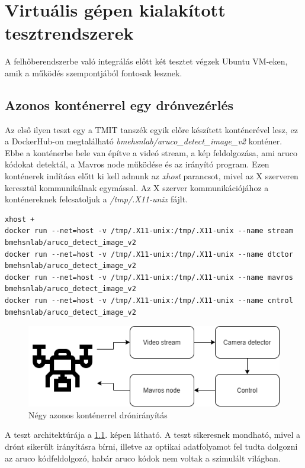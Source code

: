 \chapter{Virtuális gépen kialakított tesztrendszerek}
\label{chap:vmtest}
A felhőberendszerbe való integrálás előtt két tesztet végzek Ubuntu VM-eken, amik a működés szempontjából fontosak lesznek.
\section{Azonos konténerrel egy drónvezérlés}
Az első ilyen teszt egy a TMIT tanszék egyik előre készített konténerével lesz, ez a DockerHub-on megtalálható \emph{bmehsnlab/aruco\_detect\_image\_v2} konténer. Ebbe a konténerbe bele van építve a videó stream, a kép feldolgozása, ami aruco kódokat detektál, a Mavros node működése és az irányító program.
Ezen konténerek indítása előtt ki kell adnunk az \emph{xhost} parancsot, mivel az X szerveren keresztül kommunikálnak egymással. Az X szerver kommunikációjához a konténereknek felcsatoljuk a \emph{/tmp/.X11-unix} fájlt.
\begin{lstlisting}[caption={Azonos konténerek indítása négy különböző feladattal és az X szerveren való kommunikációt megvalósítva}]
xhost +
docker run --net=host -v /tmp/.X11-unix:/tmp/.X11-unix --name stream bmehsnlab/aruco_detect_image_v2
docker run --net=host -v /tmp/.X11-unix:/tmp/.X11-unix --name dtctor bmehsnlab/aruco_detect_image_v2
docker run --net=host -v /tmp/.X11-unix:/tmp/.X11-unix --name mavros bmehsnlab/aruco_detect_image_v2
docker run --net=host -v /tmp/.X11-unix:/tmp/.X11-unix --name cntrol bmehsnlab/aruco_detect_image_v2
\end{lstlisting}
\begin{figure}
	\centering
	\includegraphics[width=\linewidth]{figures/local.png}
	\caption{Négy azonos konténerrel drónirányítás}
	\label{fig:azonos}
\end{figure}
A teszt architektúrája a \ref{fig:azonos}. képen látható. A teszt sikeresnek mondható, mivel a drónt sikerült irányításra bírni, illetve az optikai adatfolyamot fel tudta dolgozni az aruco kódfeldolgozó, habár aruco kódok nem voltak a szimulált világban.

